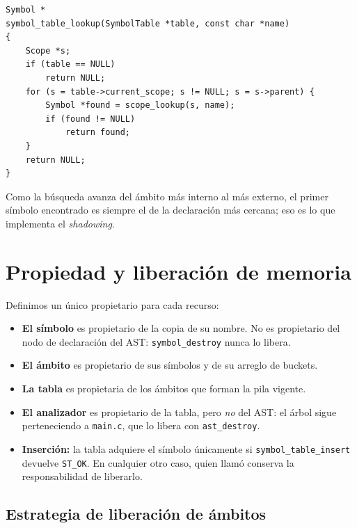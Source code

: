 \documentclass[12pt,letterpaper]{article}
\begin{document}
\begin{lstlisting}[style=modernc, caption={Búsqueda visible en \texttt{symbol\_table.c}.}]
Symbol *
symbol_table_lookup(SymbolTable *table, const char *name)
{
    Scope *s;
    if (table == NULL)
        return NULL;
    for (s = table->current_scope; s != NULL; s = s->parent) {
        Symbol *found = scope_lookup(s, name);
        if (found != NULL)
            return found;
    }
    return NULL;
}
\end{lstlisting}

\bigskip

Como la búsqueda avanza del ámbito más interno al más externo, el primer símbolo encontrado es siempre el de
la declaración más cercana; eso es lo que implementa el \emph{shadowing}.

\section*{Propiedad y liberación de memoria}

Definimos un único propietario para cada recurso:

\begin{itemize}
\item \textbf{El símbolo} es propietario de la copia de su nombre. No es propietario del nodo de declaración
  del AST: \texttt{symbol\_destroy} nunca lo libera.
  
\item \textbf{El ámbito} es propietario de sus símbolos y de su arreglo de buckets.

\item \textbf{La tabla} es propietaria de los ámbitos que forman la pila vigente.

\item \textbf{El analizador} es propietario de la tabla, pero \emph{no} del AST: el árbol sigue perteneciendo a
  \texttt{main.c}, que lo libera con \texttt{ast\_destroy}.

\item \textbf{Inserción:} la tabla adquiere el símbolo únicamente si \texttt{symbol\_table\_insert} devuelve
  \texttt{ST\_OK}. En cualquier otro caso, quien llamó conserva la responsabilidad de liberarlo.
\end{itemize}

\subsection*{Estrategia de liberación de ámbitos}
\end{document}
